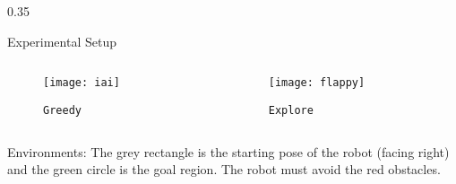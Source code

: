 \begin{columns}[t]
\begin{column} {0.35\textwidth}
\begin{block}{\large Experimental Setup}
\begin{itemize}
		\end{itemize}
		\centering
			\vspace{0.2in}
			\begin{columns}
				\centering
				\begin{column}{0.4\columnwidth} 
					\centering
					\begin{figure}
					\texttt{[image: iai]}
					\caption{\texttt{Greedy}} 
					\end{figure}
				\end{column}
				\hfill
				\begin{column}{0.4\columnwidth} 
					\centering
					\begin{figure}
					\texttt{[image: flappy]}
					\caption{\texttt{Explore}} 
					\end{figure}
				\end{column}
			\end{columns}
			\vspace{0.2in}
			\small{Environments: The grey rectangle is the starting pose of the robot (facing right) and the green circle is the goal region. The robot must avoid the red obstacles.}
			\vspace{0.1in}
		\end{block}
	\end{column}
\end{columns}



